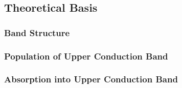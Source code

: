 
\subsection{Theoretical Basis}

\subsubsection{Band Structure}

\subsubsection{Population of Upper Conduction Band}

\subsubsection{Absorption into Upper Conduction Band}

